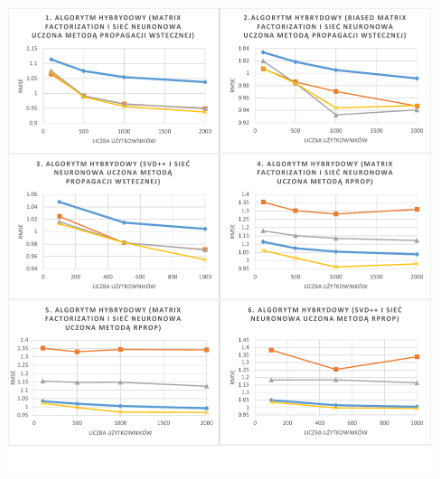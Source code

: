 \documentclass[twoside]{iisthesis}
\begin{document}
		\begin{figure}[!ht]
			\centering
			\includegraphics[page=1,width=1\textwidth]{exphybrid_movielens2}
			\label{fig:exphybrid_movielens2a}
		\end{figure}
		
\end{document}
